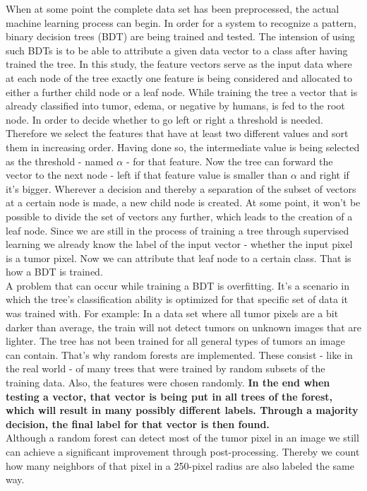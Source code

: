 \documentclass{article}
\begin{document}
 When at some point the complete data set has been preprocessed, the actual machine learning process can begin. In order for a system to recognize a pattern, binary decision trees (BDT) are being trained and tested. The intension of using such BDTs is to be able to attribute a given data vector to a class after having trained the tree. In this study, the feature vectors serve as the input data where at each node of the tree exactly one feature is being considered and allocated to either a further child node or a leaf node. While training the tree a vector that is already classified into tumor, edema, or negative by humans, is fed to the root node. In order to decide whether to go left or right a threshold is needed. Therefore we select the features that have at least two different values and sort them in increasing order. Having done so, the intermediate value is being selected as the threshold - named $\alpha $ - for that feature. Now the tree can forward the vector to the next node - left if that feature value is smaller than $\alpha $ and right if it's bigger. Wherever a decision and thereby a separation of the subset of vectors at a certain node is made, a new child node is created. At some point, it won't be possible to divide the set of vectors any further, which leads to the creation of a leaf node. Since we are still in the process of training a tree through supervised learning we already know the label of the input vector - whether the input pixel is a tumor pixel. Now we can attribute that leaf node to a certain class. That is how a BDT is trained. \\


 A problem that can occur while training a BDT is overfitting. It's a scenario in which the tree's classification ability is optimized for that specific set of data it was trained with. For example: In a data set where all tumor pixels are a bit darker than average, the train will not detect tumors on unknown images that are lighter. The tree has not been trained for all general types of tumors an image can contain. That's why random forests are implemented. These consist - like in the real world - of many trees that were trained by random subsets of the training data. Also, the features were chosen randomly. \textbf{In the end when testing a vector, that vector is being put in all trees of the forest, which will result in many possibly different labels. Through a majority decision, the final label for that vector is then found.}\\
 Although a random forest can detect most of the tumor pixel in an image we still can achieve a significant improvement through post-processing. Thereby we count how many neighbors of that pixel in a 250-pixel radius are also labeled the same way. 
\end{document}
